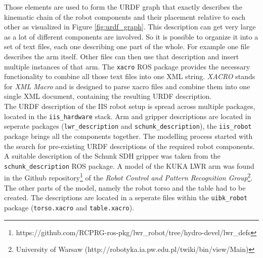 Those elements are used to form the URDF graph that exactly describes the kinematic chain of the robot components and their placement relative to each other as visualized in Figure \ref{fig:urdf_graph}. This description can get very large as a lot of different components are involved. So it is possible to organize it into a set of text files, each one describing one part of the whole. For example one file describes the arm itself. Other files can then use that description and insert multiple instances of that arm. The \texttt{xacro} ROS package provides the necessary functionality to combine all those text files into one XML string. \emph{XACRO} stands for \emph{XML Macro} and is designed to parse xacro files and combine them into one single XML document, containing the resulting URDF description.\\

The URDF description of the IIS robot setup is spread across multiple packages, located in the \texttt{iis\_hardware} stack. Arm and gripper descriptions are located in seperate packages (\texttt{lwr\_description} and \texttt{schunk\_description}), the \texttt{iis\_robot} package brings all the components together. The modelling process started with the search for pre-existing URDF descriptions of the required robot components. A suitable description of the Schunk SDH gripper was taken from the \texttt{schunk\_description} ROS package. A model of the KUKA LWR arm was found in the Github repository\footnote{https://github.com/RCPRG-ros-pkg/lwr\_robot/tree/hydro-devel/lwr\_defs} of the \emph{Robot Control and Pattern Recognition Group}\footnote{University of Warsaw (http://robotyka.ia.pw.edu.pl/twiki/bin/view/Main)}. The other parts of the model, namely the robot torso and the table had to be created. The descriptions are located in a seperate files within the \texttt{uibk\_robot} package (\texttt{torso.xacro} and \texttt{table.xacro}).

